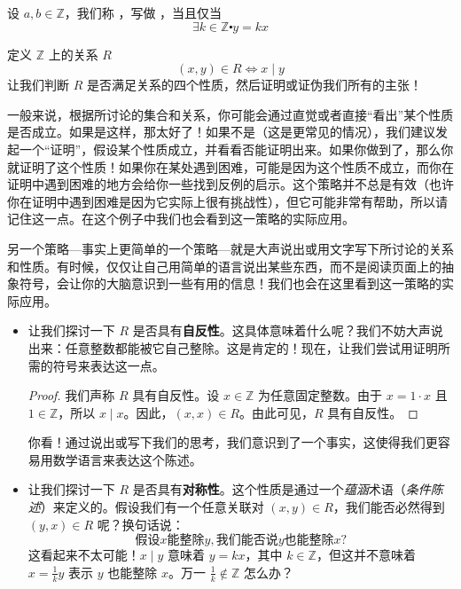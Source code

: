 \begin{definition}\label{def:definition6.2.15}
    设 $a,b \in \mathbb{Z}$，我们称 ，写做 ，当且仅当
    \[\exists k \in \mathbb{Z} \centerdot y = kx\]
\end{definition}

\begin{example}\label{ex:example6.2.16}
    定义 $\mathbb{Z}$ 上的关系 $R$
    \[(x, y) \in R \iff x \mid y\]
    让我们判断 $R$ 是否满足关系的四个性质，然后证明或证伪我们所有的主张！

    一般来说，根据所讨论的集合和关系，你可能会通过直觉或者直接``看出''某个性质是否成立。如果是这样，那太好了！如果不是（这是更常见的情况），我们建议发起一个``证明''，假设某个性质成立，并看看否能证明出来。如果你做到了，那么你就证明了这个性质！如果你在某处遇到困难，可能是因为这个性质不成立，而你在证明中遇到困难的地方会给你一些找到反例的启示。这个策略并不总是有效（也许你在证明中遇到困难是因为它实际上很有挑战性），但它可能非常有帮助，所以请记住这一点。在这个例子中我们也会看到这一策略的实际应用。

    另一个策略---事实上更简单的一个策略---就是大声说出或用文字写下所讨论的关系和性质。有时候，仅仅让自己用简单的语言说出某些东西，而不是阅读页面上的抽象符号，会让你的大脑意识到一些有用的信息！我们也会在这里看到这一策略的实际应用。

    \begin{itemize}
        \item 让我们探讨一下 $R$ 是否具有\textbf{自反性}。这具体意味着什么呢？我们不妨大声说出来：任意整数都能被它自己整除。这是肯定的！现在，让我们尝试用证明所需的符号来表达这一点。
        \begin{proof}
            我们声称 $R$ 具有自反性。设 $x \in \mathbb{Z}$ 为任意固定整数。由于 $x = 1 \cdot x$ 且 $1 \in \mathbb{Z}$，所以 $x \mid x$。因此，$(x, x) \in R$。由此可见，$R$ 具有自反性。
        \end{proof}
        你看！通过说出或写下我们的思考，我们意识到了一个事实，这使得我们更容易用数学语言来表达这个陈述。
        \item 让我们探讨一下 $R$ 是否具有\textbf{对称性}。这个性质是通过一个\emph{蕴涵}术语（\emph{条件陈述}）来定义的。假设我们有一个任意关联对 $(x, y) \in R$，我们能否必然得到 $(y, x) \in R$ 呢？换句话说：
        \[\text{假设} x \text{能整除} y, \text{我们能否说} y \text{也能整除} x \text{?} \]
        这看起来不太可能！$x \mid y$ 意味着 $y = kx$，其中 $k \in \mathbb{Z}$，但这并不意味着 $x = \frac{1}{k}y$ 表示 $y$ 也能整除 $x$。万一 $\frac{1}{k} \notin \mathbb{Z}$ 怎么办？


\end{itemize}
\end{example}
